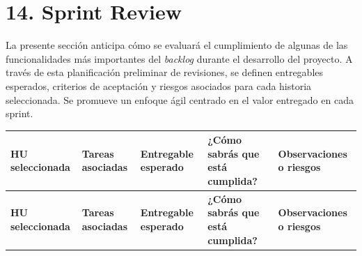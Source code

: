 \documentclass[
11pt, %
]{charter}
\begin{document}
\section{14. Sprint Review}
\label{sec:sprint_review}

La presente sección anticipa cómo se evaluará el cumplimiento de algunas de las funcionalidades más importantes del \textit{backlog} durante el desarrollo del proyecto. A través de esta planificación preliminar de revisiones, se definen entregables esperados, criterios de aceptación y riesgos asociados para cada historia seleccionada. Se promueve un enfoque ágil centrado en el valor entregado en cada sprint.

\begin{longtable}{|>{\raggedright\arraybackslash}m{2.3cm}|
                  >{\raggedright\arraybackslash}m{3cm}|
                  >{\raggedright\arraybackslash}m{2.5cm}|
                  >{\raggedright\arraybackslash}m{3.2cm}|
                  >{\raggedright\arraybackslash}m{2.5cm}|}
\hline
\rowcolor[HTML]{CCCCCC}
\textbf{HU seleccionada} & \textbf{Tareas asociadas} & \textbf{Entregable esperado} & \textbf{¿Cómo sabrás que está cumplida?} & \textbf{Observaciones o riesgos} \\
\hline
\endfirsthead

\hline
\rowcolor[HTML]{CCCCCC}
\textbf{HU seleccionada} & \textbf{Tareas asociadas} & \textbf{Entregable esperado} & \textbf{¿Cómo sabrás que está cumplida?} & \textbf{Observaciones o riesgos} \\
\hline
\endhead


\end{longtable}
\end{document}
